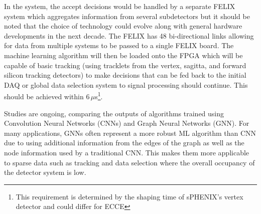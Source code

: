 In the system, the accept decisions would be handled by a separate FELIX system which aggregates information from several subdetectors but it should be noted that the choice of technology could evolve along with general hardware developments in the next decade. The FELIX has 48 bi-directional links allowing for data from multiple systems to be passed to a single FELIX board. The machine learning algorithm will then be loaded onto the FPGA which will be capable of basic tracking (using tracklets from the vertex, sagitta, and forward silicon tracking detectors) to make decisions that can be fed back to the initial DAQ or global data selection system to signal processing should continue. This should be achieved within 6$\,\mu$s\footnote{This requirement is determined by the shaping time of sPHENIX's vertex detector and could differ for ECCE}. %

%		

Studies are ongoing, comparing the outputs of algorithms trained using Convolution Neural Networks (CNNs) and Graph Neural Networks (GNN). For many applications, GNNs often represent a more robust ML algorithm than CNN due to using additional information from the edges of the graph as well as the node information used by a traditional CNN. This makes them more applicable to sparse data such as tracking and data selection where the overall occupancy of the detector system is low.

